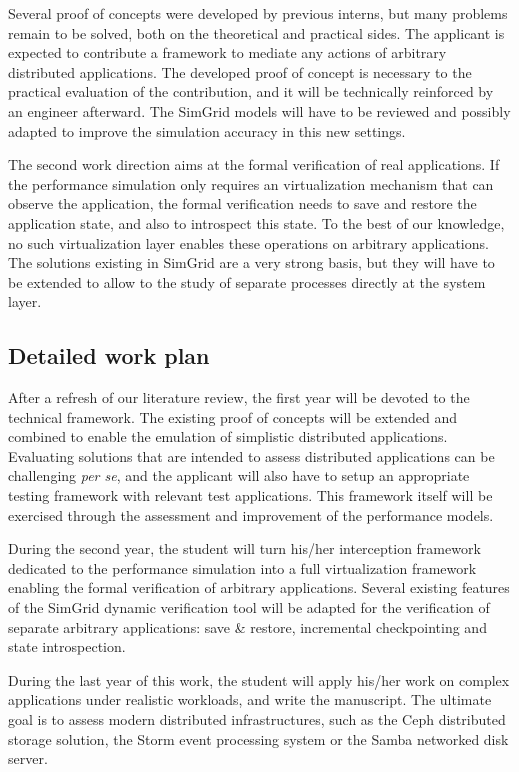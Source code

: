 \documentclass[a4paper,11pt]{article}
\begin{document}
Several proof of concepts were developed by previous interns, but many
problems remain to be solved, both on the theoretical and practical
sides. The applicant is expected to contribute a framework to mediate
any actions of arbitrary distributed applications. The developed proof
of concept is necessary to the practical evaluation of the
contribution, and it will be technically reinforced by an engineer
afterward. The SimGrid models will have to be reviewed and possibly
adapted to improve the simulation accuracy in this new settings.

The second work direction aims at the formal verification of real
applications. If the performance simulation only requires an
virtualization mechanism that can observe the application, the formal
verification needs to save and restore the application state, and also
to introspect this state.
%
To the best of our knowledge, no such virtualization layer enables
these operations on arbitrary applications. The solutions existing in
SimGrid are a very strong basis, but they will have to be extended to
allow to the study of separate processes directly at the system layer.

\subsection*{Detailed work plan}
After a refresh of our literature review, the first year will be
devoted to the technical framework. The existing proof of concepts
will be extended and combined to enable the emulation of simplistic
distributed applications. Evaluating solutions that are intended to
assess distributed applications can be challenging \textit{per se},
and the applicant will also have to setup an appropriate testing
framework with relevant test applications. This framework itself will
be exercised through the assessment and improvement of the performance
models.

During the second year, the student will turn his/her interception
framework dedicated to the performance simulation into a full
virtualization framework enabling the formal verification of arbitrary
applications. Several existing features of the SimGrid dynamic
verification tool will be adapted for the verification of separate
arbitrary applications: save \& restore, incremental checkpointing and
state introspection.

During the last year of this work, the student will apply his/her work
on complex applications under realistic workloads, and write the
manuscript. The ultimate goal is to assess modern distributed
infrastructures, such as the Ceph distributed storage solution, the
Storm event processing system or the Samba networked disk server.
\end{document}
